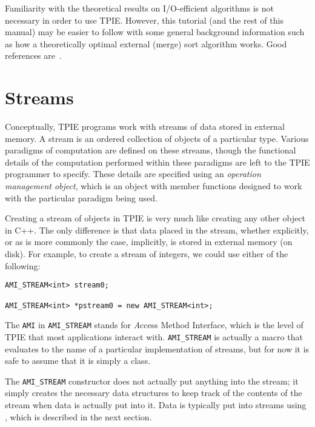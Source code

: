  Familiarity with the
theoretical results on I/O-efficient algorithms is not
necessary in order to use TPIE. However, this tutorial (and
the rest of this manual) may be easier to follow with some
general background information such as how a theoretically
optimal external (merge) sort algorithm works. Good
references 
are~\cite{vitter:podssurvey,arge:gisbook,aggarwal:input}.


\section{Streams}


Conceptually, TPIE programs work with streams of data stored in external
memory. A stream is an ordered collection of objects of a particular type.
Various paradigms of computation are defined on these streams, though the
functional details of the computation performed within these paradigms are
left to the TPIE programmer to specify. These details are specified using
an {\em operation management object},
which is an object with member functions designed to work with the
particular paradigm being used.

Creating a stream of objects in TPIE is very much like creating any other
object in C++. The only difference is that data placed in the stream,
whether explicitly, or as is more commonly the case, implicitly, is stored
in external memory (on disk). For example, to create a stream of integers,
we could use either of the following:
\begin{verbatim}
AMI_STREAM<int> stream0;

AMI_STREAM<int> *pstream0 = new AMI_STREAM<int>;
\end{verbatim}

The {\tt AMI} in {\tt AMI\_STREAM} stands for {\emph Access Method
Interface}, which is the level of TPIE that
most applications interact with. {\tt AMI\_STREAM} is actually a macro that
evaluates to the name of a particular implementation of streams, but for
now it is safe to assume that it is simply a class.

The {\tt AMI\_STREAM} constructor does not actually put anything into
the stream; it simply creates the necessary data structures to keep
track of the contents of the stream when data is actually put into it.
Data is typically put into streams using , which is
described in the next section.

